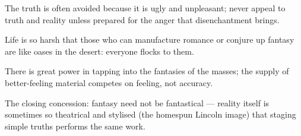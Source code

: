 

\begin{distilled}
  \item The truth is often avoided because it is ugly and unpleasant; never appeal to truth and reality unless prepared for the anger that disenchantment brings.
  \item Life is so harsh that those who can manufacture romance or conjure up fantasy are like oases in the desert: everyone flocks to them.
  \item There is great power in tapping into the fantasies of the masses; the supply of better-feeling material competes on feeling, not accuracy.
  \item The closing concession: fantasy need not be fantastical --- reality itself is sometimes so theatrical and stylised (the homespun Lincoln image) that staging simple truths performs the same work.
\end{distilled}
